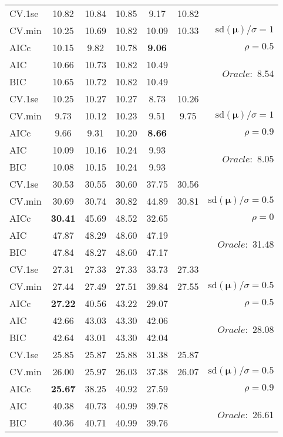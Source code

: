 \begin{table}
\begin{center}
\begin{tabular}{l*{5}{c}|r}
 \hline 
CV.1se & 10.82 & 10.84 & 10.85 & 9.17 & 10.82 & \\
CV.min & 10.25 & 10.69 & 10.82 & 10.09 & 10.33 &  $\mathrm{sd}(\mathbf{\mu})/\sigma=1$ \\
AICc & 10.15 & 9.82 & 10.78 & {\bf 9.06} & & $\rho=0.5$ \\
AIC & 10.66 & 10.73 & 10.82 & 10.49 & &  \multirow{2}{*}{$Oracle: $ 8.54} \\
BIC & 10.65 & 10.72 & 10.82 & 10.49 & &  \\
 \hline 
CV.1se & 10.25 & 10.27 & 10.27 & 8.73 & 10.26 & \\
CV.min & 9.73 & 10.12 & 10.23 & 9.51 & 9.75 &  $\mathrm{sd}(\mathbf{\mu})/\sigma=1$ \\
AICc & 9.66 & 9.31 & 10.20 & {\bf 8.66} & & $\rho=0.9$ \\
AIC & 10.09 & 10.16 & 10.24 & 9.93 & &  \multirow{2}{*}{$Oracle: $ 8.05} \\
BIC & 10.08 & 10.15 & 10.24 & 9.93 & &  \\
 \hline 
CV.1se & 30.53 & 30.55 & 30.60 & 37.75 & 30.56 & \\
CV.min & 30.69 & 30.74 & 30.82 & 44.89 & 30.81 &  $\mathrm{sd}(\mathbf{\mu})/\sigma=0.5$ \\
AICc & {\bf 30.41} & 45.69 & 48.52 & 32.65 & & $\rho=0$ \\
AIC & 47.87 & 48.29 & 48.60 & 47.19 & &  \multirow{2}{*}{$Oracle: $ 31.48} \\
BIC & 47.84 & 48.27 & 48.60 & 47.17 & &  \\
 \hline 
CV.1se & 27.31 & 27.33 & 27.33 & 33.73 & 27.33 & \\
CV.min & 27.44 & 27.49 & 27.51 & 39.84 & 27.55 &  $\mathrm{sd}(\mathbf{\mu})/\sigma=0.5$ \\
AICc & {\bf 27.22} & 40.56 & 43.22 & 29.07 & & $\rho=0.5$ \\
AIC & 42.66 & 43.03 & 43.30 & 42.06 & &  \multirow{2}{*}{$Oracle: $ 28.08} \\
BIC & 42.64 & 43.01 & 43.30 & 42.04 & &  \\
 \hline 
CV.1se & 25.85 & 25.87 & 25.88 & 31.38 & 25.87 & \\
CV.min & 26.00 & 25.97 & 26.03 & 37.38 & 26.07 &  $\mathrm{sd}(\mathbf{\mu})/\sigma=0.5$ \\
AICc & {\bf 25.67} & 38.25 & 40.92 & 27.59 & & $\rho=0.9$ \\
AIC & 40.38 & 40.73 & 40.99 & 39.78 & &  \multirow{2}{*}{$Oracle: $ 26.61} \\
BIC & 40.36 & 40.71 & 40.99 & 39.76 & &  \\
 \hline 
\end{tabular}
\end{center}
\vspace{-1cm}
\end{table}




